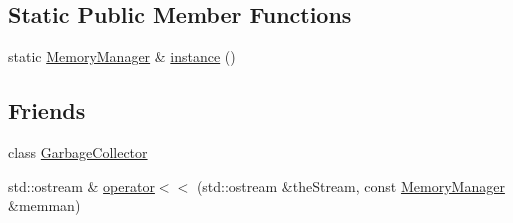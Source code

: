 \subsection*{Static Public Member Functions}
\begin{DoxyCompactItemize}
\item 
static \hyperlink{classcrap_1_1memory_1_1_memory_manager}{Memory\-Manager} \& \hyperlink{classcrap_1_1memory_1_1_memory_manager_a6a93251772d3a8d367c04423d63ddfef}{instance} ()
\end{DoxyCompactItemize}
\subsection*{Friends}
\begin{DoxyCompactItemize}
\item 
class \hyperlink{classcrap_1_1memory_1_1_memory_manager_aed63c75a6d93c19ed9b14ec512386a34}{Garbage\-Collector}
\item 
std\-::ostream \& \hyperlink{classcrap_1_1memory_1_1_memory_manager_adc2c16efbc26083839c9b5464d9a13a3}{operator$<$$<$} (std\-::ostream \&the\-Stream, const \hyperlink{classcrap_1_1memory_1_1_memory_manager}{Memory\-Manager} \&memman)
\end{DoxyCompactItemize}


